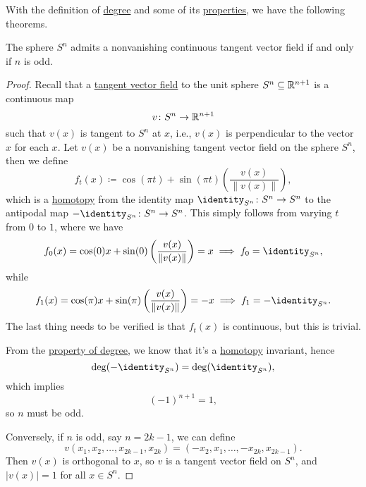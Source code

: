 With the definition of \hyperref[def:degree]{degree} and some of its \hyperref[rmk:property-of-degree]{properties}, we have the following theorems.
\begin{theorem}\label{thm:hairy-ball-theorem}
	The sphere \(S^n\) admits a nonvanishing continuous tangent vector field if and only if \(n\) is odd.
\end{theorem}
\begin{proof}
	Recall that a \underline{tangent vector field} to the unit sphere \(S^n\subseteq \mathbb{\MakeUppercase{r}} ^{n+1}\) is a continuous map
	\[
		v \colon S^n \to \mathbb{\MakeUppercase{r}} ^{n+1}
	\]
	such that \(v(x)\) is tangent to \(S^n\) at \(x\), i.e., \(v(x)\) is perpendicular to the vector \(x\) for each \(x\). Let \(v(x)\) be a
	nonvanishing tangent vector field on the sphere \(S^n\), then we define
	\[
		f_t(x) \coloneqq \cos (\pi t) + \sin (\pi t)\left(\frac{v(x)}{\left\lVert v(x)\right\rVert }\right),
	\]
	which is a \hyperref[def:homotopy]{homotopy} from the identity map \(\identity_{S^n}\colon S^n \to S^n \) to the antipodal map
	\(-\identity_{S^n}\colon S^{n}\to S^n\). This simply follows from varying \(t\) from \(0\) to \(1\), where we have
	\[
		f_0(x) = \cos (0) x + \sin (0) \left(\frac{v(x)}{\left\lVert v(x)\right\rVert }\right) = x \implies f_0 = \identity_{S^n} ,
	\]
	while
	\[
		f_1(x) = \cos (\pi )x + \sin (\pi )\left(\frac{v(x)}{\left\lVert v(x)\right\rVert }\right) = - x \implies f_{1} = - \identity_{S^n}.
	\]
	The last thing needs to be verified is that \(f_t(x)\) is continuous, but this is trivial.


	From the \hyperref[rmk:property-of-degree]{property of degree}, we know that it's a \hyperref[def:homotopy]{homotopy} invariant, hence
	\[
		\deg (-\identity_{S^n}) = \deg (\identity_{S^n} ),
	\]
	which implies
	\[
		(-1)^{n+1} = 1,
	\]
	so \(n\) must be odd.

	Conversely, if \(n\) is odd, say \(n=2k-1\), we can define
	\[
		v(x_1, x_2, \ldots , x_{2k-1}, x_{2k})= (-x_2, x_1, \ldots , -x_{2k}, x_{2k-1}).
	\]
	Then \(v(x)\) is orthogonal to \(x\), so \(v\) is a tangent vector field on \(S^n\), and \(\left\vert v(x) \right\vert = 1\) for all \(x\in S^n\).
\end{proof}

